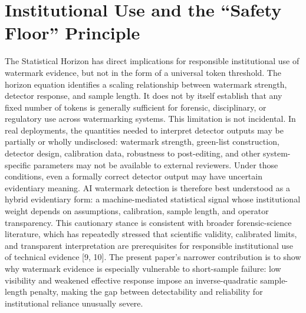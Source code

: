 \documentclass[11pt]{article}
\begin{document}
\section{Institutional Use and the ``Safety Floor'' Principle}
The Statistical Horizon has direct implications for responsible institutional use of
watermark evidence, but not in the form of a universal token threshold. The horizon
equation identifies a scaling relationship between watermark strength, detector
response, and sample length. It does not by itself establish that any fixed number
of tokens is generally sufficient for forensic, disciplinary, or regulatory use
across watermarking systems.
This limitation is not incidental. In real deployments, the quantities needed to
interpret detector outputs may be partially or wholly undisclosed: watermark
strength, green-list construction, detector design, calibration data, robustness to
post-editing, and other system-specific parameters may not be available to external
reviewers. Under those conditions, even a formally correct detector output may have
uncertain evidentiary meaning.
AI watermark detection is therefore best understood as a hybrid evidentiary form: a
machine-mediated statistical signal whose institutional weight depends on
assumptions, calibration, sample length, and operator transparency. This cautionary
stance is consistent with broader forensic-science literature, which has repeatedly
stressed that scientific validity, calibrated limits, and transparent interpretation
are prerequisites for responsible institutional use of technical evidence [9, 10].
The present paper's narrower contribution is to show why watermark evidence is
especially vulnerable to short-sample failure: low visibility and weakened effective
response impose an inverse-quadratic sample-length penalty, making the gap between
detectability and reliability for institutional reliance unusually severe.
\end{document}
